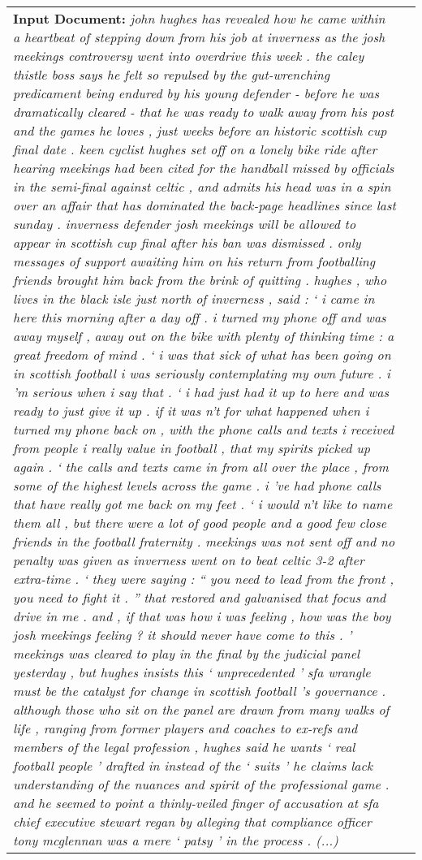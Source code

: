\documentclass[11pt,a4paper]{article}
\begin{document}
\begin{figure*}
\centering
\begin{tabularx}{\textwidth}{|X|l|}
\hline
\textbf{Input Document:} \emph{john hughes has revealed how he came within a heartbeat of stepping down from his job at inverness as the josh meekings controversy went into overdrive this week . the caley thistle boss says he felt so repulsed by the gut-wrenching predicament being endured by his young defender - before he was dramatically cleared - that he was ready to walk away from his post and the games he loves , just weeks before an historic scottish cup final date . keen cyclist hughes set off on a lonely bike ride after hearing meekings had been cited for the handball missed by officials in the semi-final against celtic , and admits his head was in a spin over an affair that has dominated the back-page headlines since last sunday . inverness defender josh meekings will be allowed to appear in scottish cup final after his ban was dismissed . only messages of support awaiting him on his return from footballing friends brought him back from the brink of quitting . hughes , who lives in the black isle just north of inverness , said : ` i came in here this morning after a day off . i turned my phone off and was away myself , away out on the bike with plenty of thinking time : a great freedom of mind . ` i was that sick of what has been going on in scottish football i was seriously contemplating my own future . i 'm serious when i say that . ` i had just had it up to here and was ready to just give it up . if it was n't for what happened when i turned my phone back on , with the phone calls and texts i received from people i really value in football , that my spirits picked up again . ` the calls and texts came in from all over the place , from some of the highest levels across the game . i 've had phone calls that have really got me back on my feet . ` i would n't like to name them all , but there were a lot of good people and a good few close friends in the football fraternity . meekings was not sent off and no penalty was given as inverness went on to beat celtic 3-2 after extra-time . ` they were saying : `` you need to lead from the front , you need to fight it . '' that restored and galvanised that focus and drive in me . and , if that was how i was feeling , how was the boy josh meekings feeling ? it should never have come to this . ' meekings was cleared to play in the final by the judicial panel yesterday , but hughes insists this ` unprecedented ' sfa wrangle must be the catalyst for change in scottish football 's governance . although those who sit on the panel are drawn from many walks of life , ranging from former players and coaches to ex-refs and members of the legal profession , hughes said he wants ` real football people ' drafted in instead of the ` suits ' he claims lack understanding of the nuances and spirit of the professional game . and he seemed to point a thinly-veiled finger of accusation at sfa chief executive stewart regan by alleging that compliance officer tony mcglennan was a mere ` patsy ' in the process . (...)}\\

\end{tabularx}
\end{figure*}
\end{document}
